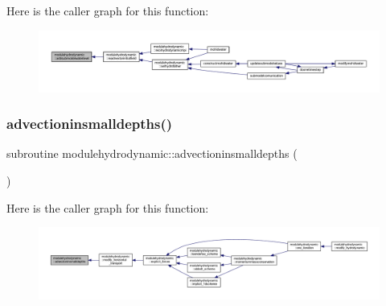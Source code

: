 Here is the caller graph for this function\+:\nopagebreak
\begin{figure}[H]
\begin{center}
\leavevmode
\includegraphics[width=350pt]{namespacemodulehydrodynamic_aab2200414765344d596b6ebaadc2fa4a_icgraph}
\end{center}
\end{figure}
\mbox{\label{namespacemodulehydrodynamic_afb548a927ee2fd2189deebf674794975}} 
\subsubsection{\texorpdfstring{advectioninsmalldepths()}{advectioninsmalldepths()}}
{\footnotesize\ttfamily subroutine modulehydrodynamic\+::advectioninsmalldepths (\begin{DoxyParamCaption}{ }\end{DoxyParamCaption})\hspace{0.3cm}{\ttfamily [private]}}

Here is the caller graph for this function\+:\nopagebreak
\begin{figure}[H]
\begin{center}
\leavevmode
\includegraphics[width=350pt]{namespacemodulehydrodynamic_afb548a927ee2fd2189deebf674794975_icgraph}
\end{center}
\end{figure}
\mbox{\label{namespacemodulehydrodynamic_a0d43e324a40d96741fa99e647c0d0e01}} 
